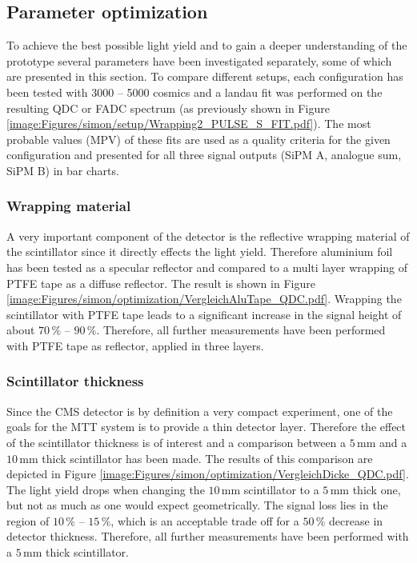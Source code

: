\subsection{Parameter optimization}
\label{section:simon/optimization}
To achieve the best possible light yield and to gain a deeper understanding of the prototype several parameters have been investigated separately, some of which are presented in this section. To compare different setups, each configuration has been tested with 3000 -- 5000 cosmics and a landau fit was performed on the resulting QDC or FADC spectrum (as previously shown in Figure \ref{image:Figures/simon/setup/Wrapping2_PULSE_S_FIT.pdf}). The most probable values (MPV) of these fits are used as a quality criteria for the given configuration and presented for all three signal outputs (SiPM A, analogue sum, SiPM B) in bar charts.
%
\subsubsection{Wrapping material}
A very important component of the detector is the reflective wrapping material of the scintillator since it directly effects the light yield. Therefore aluminium foil has been tested as a specular reflector and compared to a multi layer wrapping of PTFE tape as a diffuse reflector. The result is shown in Figure \ref{image:Figures/simon/optimization/VergleichAluTape_QDC.pdf}. Wrapping the scintillator with PTFE tape leads to a significant increase in the signal height of about $70\,\%$ -- $90\,\%$. Therefore, all further measurements have been performed with PTFE tape as reflector, applied in three layers.
%
\subsubsection{Scintillator thickness}
Since the CMS detector is by definition a very compact experiment, one of the goals for the MTT system is to provide a thin detector layer. Therefore the effect of the scintillator thickness is of interest and a comparison between a $5\,\text{mm}$ and a $10\,\text{mm}$ thick scintillator has been made. The results of this comparison are depicted in Figure \ref{image:Figures/simon/optimization/VergleichDicke_QDC.pdf}. The light yield drops when changing the $10\,\text{mm}$ scintillator to a $5\,\text{mm}$ thick one, but not as much as one would expect geometrically. The signal loss lies in the region of $10\,\%$ -- $15\,\%$, which is an acceptable trade off for a $50\,\%$ decrease in detector thickness. Therefore, all further measurements have been performed with a $5\,\text{mm}$ thick scintillator.
%
